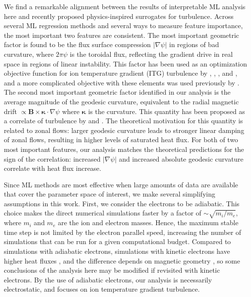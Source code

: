 \documentclass{jpp}
\newcommand{\changed}[1]{{#1}}
\begin{document}
We find a remarkable alignment between the results of interpretable ML analysis here and recently proposed physics-inspired surrogates for turbulence.
Across several ML regression methods and several ways to measure feature importance, the most important two features are consistent.
The most important geometric factor is found to be the flux surface compression $|\nabla\psi|$ in regions of bad curvature, where $2\pi\psi$ is the toroidal flux, reflecting the gradient drive in real space in regions of linear instability.
This factor has been used as an optimization objective function for ion temperature gradient (ITG) turbulence by \cite{mynick2014turbulent}, \cite{xanthopoulos2014controlling}, \cite{stroteich2022seeking}, and \cite{goodman2024quasi}, and a more complicated objective with these elements was used previously by \cite{mynick2010optimizing}.
The second most important geometric factor identified in our analysis is the average magnitude of the geodesic curvature, equivalent to the radial magnetic drift $\propto \mathbf{B}\times\mathbf{\kappa}\cdot\nabla\psi$ where $\mathbf{\kappa}$ is the curvature.
This quantity has been proposed as a correlate of turbulence by \cite{xanthopoulos2011zonal} and \cite{NAKATA2022}.
The theoretical motivation for this quantity is related to zonal flows: larger geodesic curvature leads to stronger linear damping of zonal flows, resulting in \changed{higher levels of saturated heat flux}.
For both of two most important features, our analysis matches the theoretical predictions for the sign of the correlation: increased $|\nabla\psi|$ and increased absolute geodesic curvature correlate with heat flux increase.


Since ML methods are most effective when large amounts of data are available that cover the parameter space of interest, we make several simplifying assumptions in this work.
First, we consider the electrons to be adiabatic.
This choice makes the direct numerical simulations faster by a factor of $\sim \sqrt{m_i / m_e}$, where $m_i$ and $m_e$ are the ion and electron masses.
Hence, the maximum stable time step is not limited by the electron parallel speed, increasing the number of simulations that can be run for a given computational budget.
\changed{Compared to simulations with adiabatic electrons, simulations with kinetic electrons have higher heat fluxes \citep{chen2003simulations}, and the difference depends on magnetic geometry \citep{mckinney2019comparison, goodman2024quasi}, so some conclusions of the analysis here may be modified if revisited with kinetic electrons.}
By the use of adiabatic electrons, our analysis is necessarily electrostatic, and focuses on ion temperature gradient turbulence.
\end{document}
